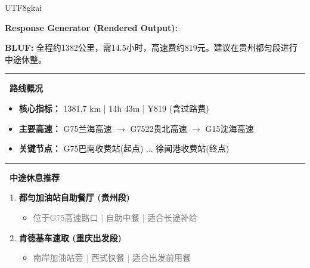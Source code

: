 \documentclass{article} %
\begin{document}
\begin{CJK*}{UTF8}{gkai}
\begin{tcolorbox}[
    breakable,
    enhanced,
    colframe=color_amapblue,
    colback=mycolor,
    coltitle=white,
    title = {\textbf{Case Study: Cross-province Self-driving Guide}},
    fonttitle=\bfseries
]
\vspace{5pt}

\textbf{Response Generator (Rendered Output):}
\begin{tcolorbox}[colback=white, colframe=color_amapblue!30!white, arc=4pt, boxrule=1pt, left=4pt, right=4pt, top=4pt, bottom=4pt]
    \small
    \textbf{BLUF:} 全程约1382公里，需14.5小时，高速费约819元。建议在贵州都匀段进行中途休整。
    
    \par\noindent\rule{\textwidth}{0.4pt}
    
    \textbf{\textcolor{color_amapblue}{\faRoad\ 路线概况}}
    \begin{itemize}[leftmargin=12pt, itemsep=2pt, topsep=2pt]
        \item \textbf{核心指标：} 1381.7 km | 14h 43m | ¥819 (含过路费)
        \item \textbf{主要高速：} G75兰海高速 $\rightarrow$ G7522贵北高速 $\rightarrow$ G15沈海高速
        \item \textbf{关键节点：} G75巴南收费站(起点) ... 徐闻港收费站(终点)
    \end{itemize}
    
    \par\noindent\rule{\textwidth}{0.4pt}
    
    \textbf{\textcolor{color_amapblue}{\faCoffee\ 中途休息推荐}}
    \begin{enumerate}[leftmargin=12pt, itemsep=2pt, topsep=2pt]
        \item \textbf{都匀加油站自助餐厅 (贵州段)}
        \begin{itemize}[leftmargin=6pt, label={}, itemsep=0pt]
            \item \scriptsize \textcolor{gray}{位于G75高速路口 | 自助中餐 | 适合长途补给}
        \end{itemize}
        \item \textbf{肯德基车速取 (重庆出发段)}
        \begin{itemize}[leftmargin=6pt, label={}, itemsep=0pt]
            \item \scriptsize \textcolor{gray}{南岸加油站旁 | 西式快餐 | 适合出发前用餐}
        \end{itemize}
    \end{enumerate}
    
    \vspace{3pt}
    

\end{tcolorbox}
\end{tcolorbox}
\end{CJK*}
\end{document}
